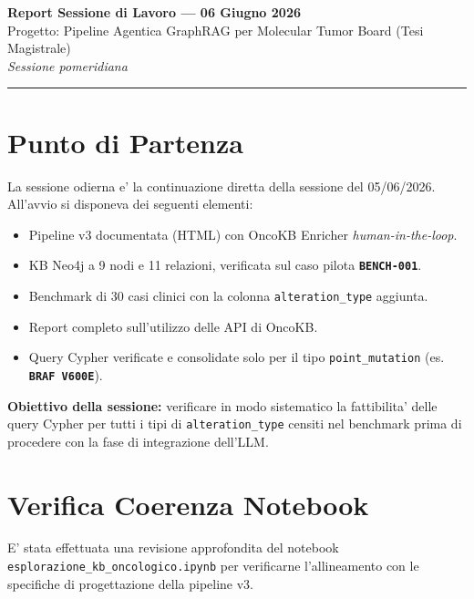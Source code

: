 \documentclass[12pt, a4paper]{article}
\newcommand{\bench}[1]{{\texttt{\textbf{#1}}}}
\begin{document}
\begin{center}
  {\LARGE\bfseries\color{primaryblue} Report Sessione di Lavoro --- 06 Giugno 2026}\\[0.4em]
  {\large\color{accentblue} Progetto: Pipeline Agentica GraphRAG per Molecular Tumor Board (Tesi Magistrale)}\\[0.2em]
  {\small\color{medgray}\textit{Sessione pomeridiana}}
\end{center}
\vspace{0.5em}\hrule\vspace{1.2em}

\section{Punto di Partenza}

La sessione odierna e' la continuazione diretta della sessione del 05/06/2026. All'avvio si disponeva dei seguenti elementi:
\begin{itemize}[leftmargin=1.6em, itemsep=3pt]
  \item Pipeline v3 documentata (HTML) con OncoKB Enricher \textit{human-in-the-loop}.
  \item KB Neo4j a 9 nodi e 11 relazioni, verificata sul caso pilota \bench{BENCH-001}.
  \item Benchmark di 30 casi clinici con la colonna \texttt{alteration\_type} aggiunta.
  \item Report completo sull'utilizzo delle API di OncoKB.
  \item Query Cypher verificate e consolidate solo per il tipo \texttt{point\_mutation} (es. \bench{BRAF V600E}).
\end{itemize}

\textbf{Obiettivo della sessione:} verificare in modo sistematico la fattibilita' delle query Cypher per tutti i tipi di \texttt{alteration\_type} censiti nel benchmark prima di procedere con la fase di integrazione dell'LLM.

\section{Verifica Coerenza Notebook}

E' stata effettuata una revisione approfondita del notebook \texttt{esplorazione\_kb\_oncologico.ipynb} per verificarne l'allineamento con le specifiche di progettazione della pipeline v3.
\end{document}

